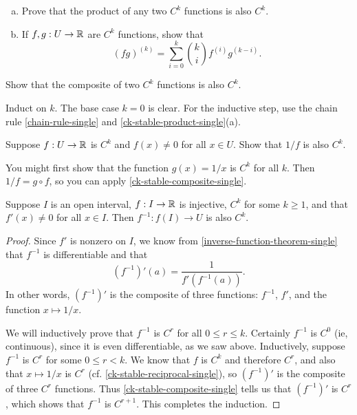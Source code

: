 \begin{exercise} \label{ck-stable-product-single}
	\begin{enumerate}[(a)]
		\item Prove that the product of any two $C^k$ functions is also $C^k$. 
		\item If $f, g : U \to \mathbb{R}$ are $C^k$ functions, show that
		\[ (fg)^{(k)} = \sum_{i = 0}^k \binom{k}{i} f^{(i)} g^{(k-i)}. \]
	\end{enumerate}
\end{exercise}

\begin{exercise} \label{ck-stable-composite-single}
	Show that the composite of two $C^k$ functions is also $C^k$. \begin{hint} Induct on $k$. The base case $k = 0$ is clear. For the inductive step, use the chain rule \ref{chain-rule-single} and \cref{ck-stable-product-single}(a). \end{hint}
\end{exercise}

\begin{exercise} \label{ck-stable-reciprocal-single}
	Suppose $f : U \to \mathbb{R}$ is $C^k$ and $f(x) \neq 0$ for all $x \in U$. Show that $1/f$ is also $C^k$.
	\begin{hint}
		You might first show that the function $g(x) = 1/x$ is $C^k$ for all $k$. Then $1/f = g \circ f$, so you can apply \cref{ck-stable-composite-single}. 
	\end{hint}
\end{exercise}

\begin{proposition} \label{ck-stable-inversion-single}
	Suppose $I$ is an open interval, $f : I \to \mathbb{R}$ is injective, $C^k$ for some $k \geq 1$, and that $f'(x) \neq 0$ for all $x \in I$. Then $f^{-1} : f(I) \to U$ is also $C^k$. 
\end{proposition}

\begin{proof}
	Since $f'$ is nonzero on $I$, we know from \cref{inverse-function-theorem-single} that $f^{-1}$ is differentiable and that
	\[ (f^{-1})'(a) = \frac{1}{f'(f^{-1}(a))}. \]
	In other words, $(f^{-1})'$ is the composite of three functions: $f^{-1}$, $f'$, and the function $x \mapsto 1/x$. 
	
	We will inductively prove that $f^{-1}$ is $C^r$ for all $0 \leq r \leq k$. Certainly $f^{-1}$ is $C^0$ (ie, continuous), since it is even differentiable, as we saw above. Inductively, suppose $f^{-1}$ is $C^r$ for some $0 \leq r < k$. We know that $f$ is $C^k$ and therefore $C^r$, and also that $x \mapsto 1/x$ is $C^r$ (cf. \cref{ck-stable-reciprocal-single}), so $(f^{-1})'$ is the composite of three $C^r$ functions. Thus \cref{ck-stable-composite-single} tells us that $(f^{-1})'$ is $C^r$, which shows that $f^{-1}$ is $C^{r+1}$. This completes the induction.  
\end{proof}

